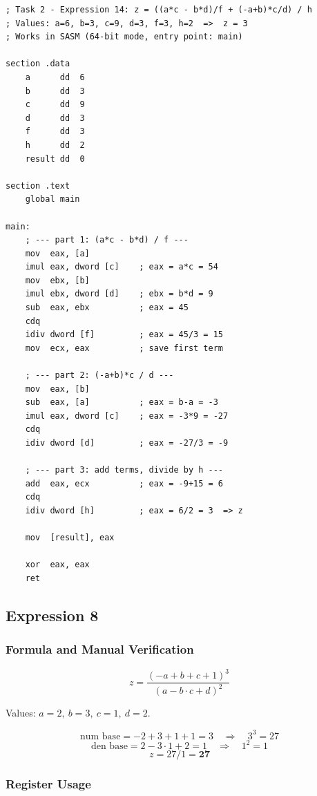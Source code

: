 \documentclass[12pt,a4paper]{article}
\begin{document}
\begin{lstlisting}[caption={task2\_expr14.asm --- Expression 14}]
; Task 2 - Expression 14: z = ((a*c - b*d)/f + (-a+b)*c/d) / h
; Values: a=6, b=3, c=9, d=3, f=3, h=2  =>  z = 3
; Works in SASM (64-bit mode, entry point: main)

section .data
    a      dd  6
    b      dd  3
    c      dd  9
    d      dd  3
    f      dd  3
    h      dd  2
    result dd  0

section .text
    global main

main:
    ; --- part 1: (a*c - b*d) / f ---
    mov  eax, [a]
    imul eax, dword [c]    ; eax = a*c = 54
    mov  ebx, [b]
    imul ebx, dword [d]    ; ebx = b*d = 9
    sub  eax, ebx          ; eax = 45
    cdq
    idiv dword [f]         ; eax = 45/3 = 15
    mov  ecx, eax          ; save first term

    ; --- part 2: (-a+b)*c / d ---
    mov  eax, [b]
    sub  eax, [a]          ; eax = b-a = -3
    imul eax, dword [c]    ; eax = -3*9 = -27
    cdq
    idiv dword [d]         ; eax = -27/3 = -9

    ; --- part 3: add terms, divide by h ---
    add  eax, ecx          ; eax = -9+15 = 6
    cdq
    idiv dword [h]         ; eax = 6/2 = 3  => z

    mov  [result], eax

    xor  eax, eax
    ret
\end{lstlisting}

\newpage
\subsection{Expression 8}

\subsubsection{Formula and Manual Verification}

\[
z = \frac{(-a+b+c+1)^{3}}{(a - b \cdot c + d)^{2}}
\]

Values: $a=2,\ b=3,\ c=1,\ d=2$.

\[
\text{num base} = -2+3+1+1 = 3 \quad\Rightarrow\quad 3^3 = 27
\]
\[
\text{den base} = 2 - 3 \cdot 1 + 2 = 1 \quad\Rightarrow\quad 1^2 = 1
\]
\[
z = 27 / 1 = \mathbf{27}
\]

\subsubsection{Register Usage}
\end{document}
